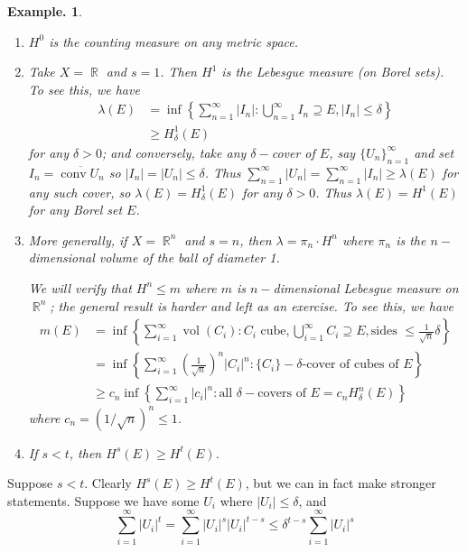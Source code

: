 \documentclass[11pt, a4paper]{memoir}
\DeclareMathOperator{\R}{{\mathbb{R}}}
\theoremstyle{change}
\theoremstyle{plain}
\theoremstyle{nonumberplain}
\newtheorem{example}{Example.}
\DeclareMathOperator{\vol}{vol}
\DeclareMathOperator{\conv}{conv}
\numberwithin{equation}{section}
\begin{document}
\begin{example}
    \begin{enumerate}[nl,r]
        \item $H^0$ is the counting measure on any metric space.
        \item Take $X=\R$ and $s=1$.
            Then $H^1$ is the Lebesgue measure (on Borel sets).
            To see this, we have
            \begin{align*}
                \lambda(E) &= \inf\left\{\sum_{n=1}^\infty |I_n|:\bigcup_{n=1}^\infty I_n\supseteq E, |I_n|\leq\delta\right\}\\
                           &\geq H^1_\delta(E)
            \end{align*}
            for any $\delta>0$; and conversely, take any $\delta-$cover of $E$, say $\{U_n\}_{n=1}^\infty$ and set $I_n=\overline{\conv U_n}$ so $|I_n|=|U_n|\leq\delta$.
            Thus $\sum_{n=1}^\infty|U_n|=\sum_{n=1}^\infty|I_n|\geq\lambda(E)$ for any such cover, so $\lambda(E)=H_\delta^1(E)$ for any $\delta>0$.
            Thus $\lambda(E)=H^1(E)$ for any Borel set $E$.
        \item More generally, if $X=\R^n$ and $s=n$, then $\lambda=\pi_n\cdot H^n$ where $\pi_n$ is the $n-$dimensional volume of the ball of diameter 1.

            We will verify that $H^n\leq m$ where $m$ is $n-$dimensional Lebesgue measure on $\R^n$; the general result is harder and left as an exercise.
            To see this, we have
            \begin{align*}
                m(E)&=\inf\left\{\sum_{i=1}^\infty\vol(C_i):C_i\text{ cube},\bigcup_{i=1}^\infty C_i\supseteq E,\text{sides }\leq\frac{1}{\sqrt{n}}\delta\right\}\\
                    &=\inf\left\{\sum_{i=1}^\infty\left(\frac{1}{\sqrt{n}}\right)^n|C_i|^n:\{C_i\}-\delta\text{-cover of cubes of }E\right\}\\
                    &\geq c_n\inf\left\{\sum_{i=1}^\infty|c_i|^n:\text{all $\delta-$covers of }E=c_nH_\delta^n(E)\right\}
            \end{align*}
            where $c_n=(1/\sqrt{n})^n\leq 1$.
        \item If $s<t$, then $H^s(E)\geq H^t(E)$.
    \end{enumerate}
\end{example}
Suppose $s<t$.
Clearly $H^s(E)\geq H^t(E)$, but we can in fact make stronger statements.
Suppose we have some $U_i$ where $|U_i|\leq\delta$, and
\begin{equation*}
    \sum_{i=1}^\infty|U_i|^t=\sum_{i=1}^\infty|U_i|^s|U_i|^{t-s}\leq\delta^{t-s}\sum_{i=1}^\infty|U_i|^s
\end{equation*}
\end{document}
